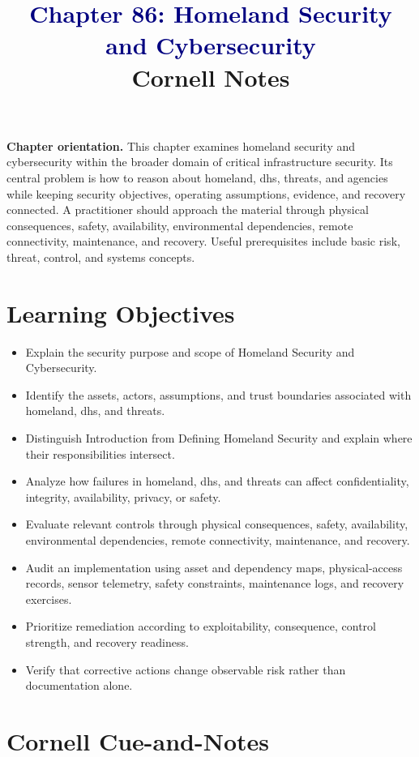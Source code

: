 \documentclass[11pt]{article}
\title{\textcolor{Navy}{Chapter 86: Homeland Security and Cybersecurity}\\[2mm]\large Cornell Notes}
\author{}
\date{}
\begin{document}
\maketitle
\thispagestyle{fancy}
\vspace{-1.5em}
\begin{orientationbox}
\textbf{Chapter orientation.} This chapter examines homeland security and cybersecurity within the broader domain of critical infrastructure security. Its central problem is how to reason about homeland, dhs, threats, and agencies while keeping security objectives, operating assumptions, evidence, and recovery connected. A practitioner should approach the material through physical consequences, safety, availability, environmental dependencies, remote connectivity, maintenance, and recovery. Useful prerequisites include basic risk, threat, control, and systems concepts.
\end{orientationbox}
\section*{Learning Objectives}
\begin{itemize}
\item Explain the security purpose and scope of Homeland Security and Cybersecurity.
\item Identify the assets, actors, assumptions, and trust boundaries associated with homeland, dhs, and threats.
\item Distinguish Introduction from Defining Homeland Security and explain where their responsibilities intersect.
\item Analyze how failures in homeland, dhs, and threats can affect confidentiality, integrity, availability, privacy, or safety.
\item Evaluate relevant controls through physical consequences, safety, availability, environmental dependencies, remote connectivity, maintenance, and recovery.
\item Audit an implementation using asset and dependency maps, physical-access records, sensor telemetry, safety constraints, maintenance logs, and recovery exercises.
\item Prioritize remediation according to exploitability, consequence, control strength, and recovery readiness.
\item Verify that corrective actions change observable risk rather than documentation alone.
\end{itemize}
\section*{Cornell Cue-and-Notes}
\end{document}

